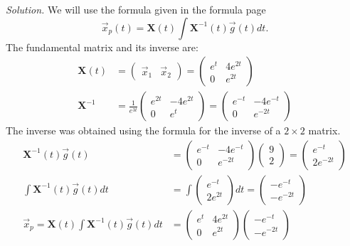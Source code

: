     \ifnum {} {\color{DarkBlue} \textit{Solution.} 
    We will use the formula given in the formula page
$$\vec x_p(t) = \mathbf{X}(t) \int \mathbf{X} ^ {-1} (t) \vec{g} (t) dt.$$
The fundamental matrix and its inverse are:
\begin{align}
    \mathbf{X} (t) 
    &= \begin{pmatrix} \vec{x}_{1} & \vec{x}_{2}\end{pmatrix} 
    = \begin{pmatrix} e ^ {t} & 4e ^ {2t}\\ 0 &   e ^ {2t} \end{pmatrix} \\
    \mathbf{X}^{-1} 
    &= \frac{1}{e^{3t}}\begin{pmatrix} e^{2t} & -4e^{2t} \\0 & e^{t}\end{pmatrix} 
    = \begin{pmatrix} e^{-t} & -4e^{-t} \\0 & e^{-2t} \end{pmatrix}
\end{align}
The inverse was obtained using the formula for the inverse of a $2\times 2$ matrix. 
\begin{align}
    \mathbf{X} ^ {-1} (t) \vec{g}(t) 
    &= \begin{pmatrix} e^{-t} & -4e^{-t} \\0 & e^{-2t} \end{pmatrix} \begin{pmatrix} 9\\2 \end{pmatrix} 
    = \begin{pmatrix} e^{-t} \\ 2e^{-2t}\end{pmatrix} \\
    \int \mathbf{X} ^ {-1} (t) \vec{g}(t) dt 
    &= \int \begin{pmatrix} e^{-t} \\ 2e^{2t}\end{pmatrix} dt = \begin{pmatrix} -e^{-t} \\ -e^{-2t} \end{pmatrix} \\
    \vec x_p = \mathbf{X}(t) \int \mathbf{X} ^ {-1} (t) \vec{g}(t) dt 
    &= \begin{pmatrix} e^{t} & 4e^{2t}\\ 0 & e^{2t} \end{pmatrix}\begin{pmatrix} -e^{-t} \\ -e^{-2t} \end{pmatrix}

\end{align}}
